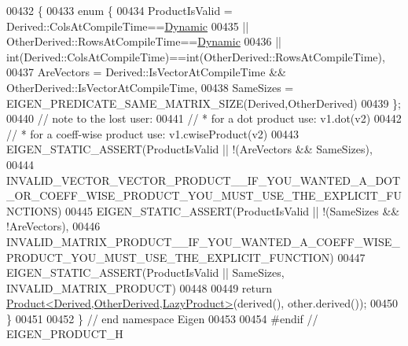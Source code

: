 \begin{DoxyCode}
00432 \textcolor{keyword}{}\{
00433   \textcolor{keyword}{enum} \{
00434     ProductIsValid =  Derived::ColsAtCompileTime==\hyperlink{namespace_eigen_ad81fa7195215a0ce30017dfac309f0b2}{Dynamic}
00435                    || OtherDerived::RowsAtCompileTime==\hyperlink{namespace_eigen_ad81fa7195215a0ce30017dfac309f0b2}{Dynamic}
00436                    || int(Derived::ColsAtCompileTime)==int(OtherDerived::RowsAtCompileTime),
00437     AreVectors = Derived::IsVectorAtCompileTime && OtherDerived::IsVectorAtCompileTime,
00438     SameSizes = EIGEN\_PREDICATE\_SAME\_MATRIX\_SIZE(Derived,OtherDerived)
00439   \};
00440   \textcolor{comment}{// note to the lost user:}
00441   \textcolor{comment}{//    * for a dot product use: v1.dot(v2)}
00442   \textcolor{comment}{//    * for a coeff-wise product use: v1.cwiseProduct(v2)}
00443   EIGEN\_STATIC\_ASSERT(ProductIsValid || !(AreVectors && SameSizes),
00444     
      INVALID\_VECTOR\_VECTOR\_PRODUCT\_\_IF\_YOU\_WANTED\_A\_DOT\_OR\_COEFF\_WISE\_PRODUCT\_YOU\_MUST\_USE\_THE\_EXPLICIT\_FUNCTIONS)
00445   EIGEN\_STATIC\_ASSERT(ProductIsValid || !(SameSizes && !AreVectors),
00446     INVALID\_MATRIX\_PRODUCT\_\_IF\_YOU\_WANTED\_A\_COEFF\_WISE\_PRODUCT\_YOU\_MUST\_USE\_THE\_EXPLICIT\_FUNCTION)
00447   EIGEN\_STATIC\_ASSERT(ProductIsValid || SameSizes, INVALID\_MATRIX\_PRODUCT)
00448 
00449   \textcolor{keywordflow}{return} \hyperlink{group___core___module_class_eigen_1_1_product}{Product<Derived,OtherDerived,LazyProduct>}(derived(), 
      other.derived());
00450 \}
00451 
00452 \} \textcolor{comment}{// end namespace Eigen}
00453 
00454 \textcolor{preprocessor}{#endif // EIGEN\_PRODUCT\_H}
\end{DoxyCode}
